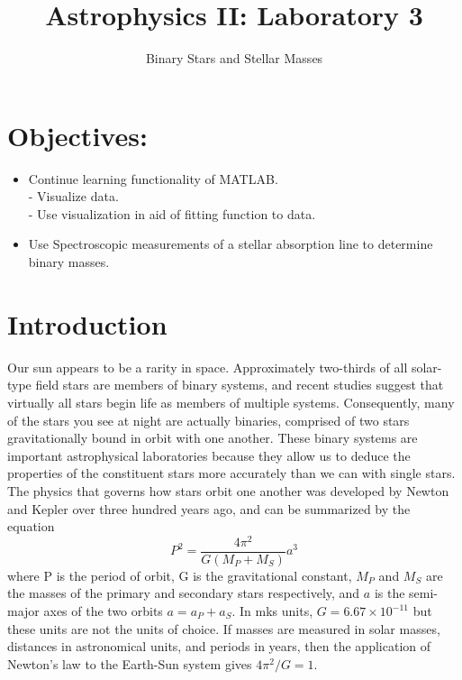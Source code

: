 \documentclass[11pt]{article}
\newcommand{\be}{\begin{equation}}
\newcommand{\ee}{\end{equation}}
\begin{document}
\title{Astrophysics II: Laboratory 3}
\author{\Large Binary Stars and Stellar Masses}
\maketitle

\setlength{\parindent}{0.2pt}
\setlength{\parskip}{2ex} 

\section{{\bf Objectives:}}

\begin{itemize}
\item Continue learning functionality of MATLAB.\\
	- Visualize data.\\
	- Use visualization in aid of fitting function to data.
\item Use Spectroscopic measurements of a stellar absorption line to determine binary masses.\\
\end{itemize}


\section{{\bf Introduction}}
	Our sun appears to be a rarity in space. Approximately two-thirds of all solar-type field stars are members of binary systems, and recent studies suggest that virtually all stars begin life as members of multiple systems. Consequently, many of the stars you see at night are actually binaries, comprised of two stars gravitationally bound in orbit with one another. These binary systems are important astrophysical laboratories because they allow us to deduce the properties of the constituent stars more accurately than we can with single stars. The physics that governs how stars orbit one another was developed by Newton and Kepler over three hundred years ago, and can be summarized by the equation
\be
	P^{2}=\frac{4\pi^{2}}{G(M_{P}+M_{S})}a^{3}
\ee
where P is the period of orbit, G is the gravitational constant, $M_{P}$ and $M_{S}$ are the masses of the primary and secondary stars respectively, and $a$ is the semi-major axes of the two orbits $a=a_{P}+a_{S}$. In mks units, $G = 6.67 \times 10^{-11}$ but these units are not the units of choice. If masses are measured in solar masses, distances in astronomical units, and periods in years, then the application of Newton's law to the Earth-Sun system gives $4\pi^{2}/G=1$.
\end{document}
